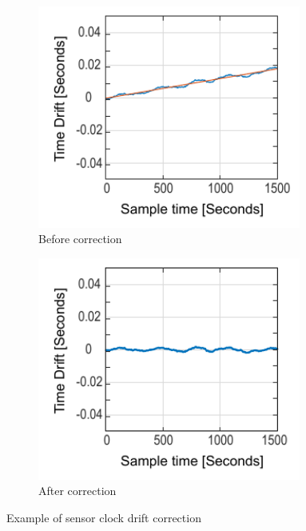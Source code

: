 \begin{figure}[hbt]
    \centering
    \begin{subfigure}{0.45\textwidth}
         \centering
         \includegraphics[width=0.95\textwidth]{content/3-Methods/Clock_Drift.pdf}
         \caption{Before correction}
    \end{subfigure}
    \begin{subfigure}{0.45\textwidth}
         \centering
         \includegraphics[width=0.95\textwidth]{content/3-Methods/Clock_Drift_Corrected.pdf}
         \caption{After correction}
    \end{subfigure}
    \caption{Example of sensor clock drift correction}
    \label{fig:methods-clock-drift-correction}
\end{figure}

